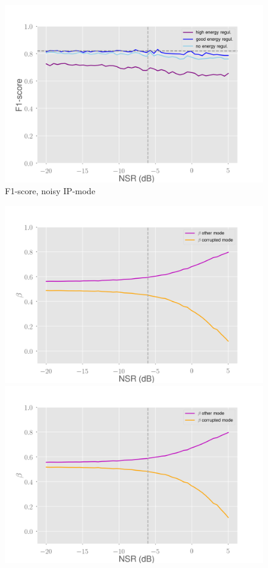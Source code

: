 \documentclass[10pt]{beamer}
\begin{document}
\begin{frame}
\begin{multicols}{2}
\begin{figure}
\begin{overprint}
    \includegraphics[scale=0.2]{figs/energy-dm-noisy}
\end{overprint}
\caption{F1-score, noisy IP-mode}
\end{figure}
\columnbreak
\begin{figure}
\centering
\begin{overprint}
    \includegraphics[scale=0.2]{figs/no-energy-dm-noisy-beta}
    \includegraphics[scale=0.2]{figs/normal-dm-noisy-beta}

\end{overprint}
\end{figure}
\end{multicols}
\end{frame}
\end{document}
